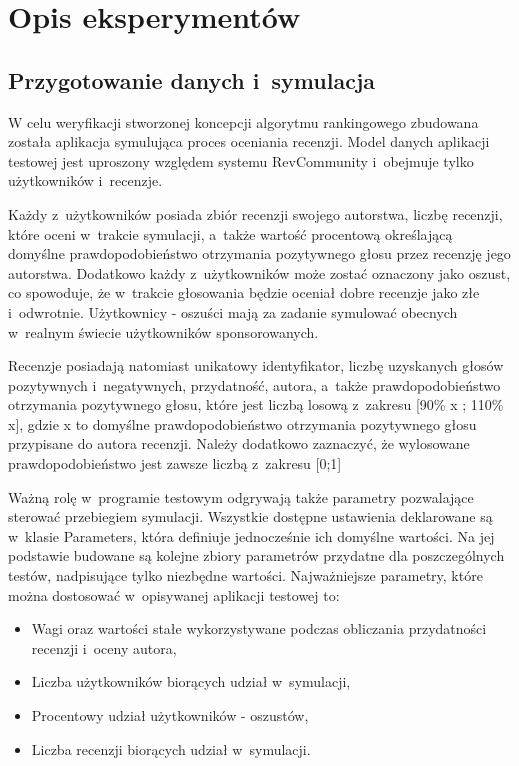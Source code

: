 \section{Opis eksperymentów}

\subsection{Przygotowanie danych i~symulacja}

W celu weryfikacji stworzonej koncepcji algorytmu rankingowego zbudowana została aplikacja symulująca proces oceniania recenzji. Model danych aplikacji testowej jest uproszony względem systemu RevCommunity i~obejmuje tylko użytkowników i~recenzje. 

Każdy z~użytkowników posiada zbiór recenzji swojego autorstwa, liczbę recenzji, które oceni w~trakcie symulacji, a~także wartość procentową określającą  domyślne prawdopodobieństwo otrzymania pozytywnego głosu przez recenzję jego autorstwa. Dodatkowo każdy z~użytkowników może zostać oznaczony jako oszust, co spowoduje, że w~trakcie głosowania będzie oceniał dobre recenzje jako złe i~odwrotnie. Użytkownicy - oszuści mają za zadanie symulować obecnych w~realnym świecie użytkowników sponsorowanych.

Recenzje posiadają natomiast unikatowy identyfikator, liczbę uzyskanych głosów pozytywnych i~negatywnych, przydatność, autora, a~także prawdopodobieństwo otrzymania pozytywnego głosu, które jest liczbą losową z~zakresu [90\% x ; 110\% x], gdzie x to domyślne prawdopodobieństwo otrzymania pozytywnego głosu przypisane do autora recenzji. Należy dodatkowo zaznaczyć, że wylosowane prawdopodobieństwo jest zawsze liczbą z~zakresu [0;1]

Ważną rolę w~programie testowym odgrywają także parametry pozwalające sterować przebiegiem symulacji. Wszystkie dostępne ustawienia deklarowane są w~klasie Parameters, która definiuje jednocześnie ich domyślne wartości. Na jej podstawie budowane są kolejne zbiory parametrów przydatne dla poszczególnych testów, nadpisujące tylko niezbędne wartości. Najważniejsze parametry, które można dostosować w~opisywanej aplikacji testowej to:

\begin{itemize}
\item Wagi oraz wartości stałe wykorzystywane podczas obliczania przydatności recenzji i~oceny autora,
\item Liczba użytkowników biorących udział w~symulacji,
\item Procentowy udział użytkowników - oszustów,
\item Liczba recenzji biorących udział w~symulacji.
\end{itemize}


